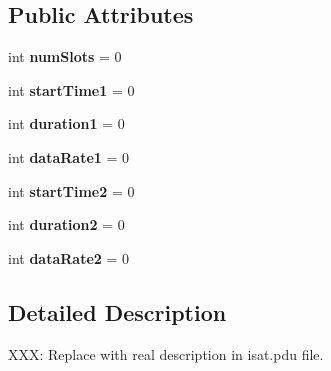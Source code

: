 \subsection*{Public Attributes}
\begin{DoxyCompactItemize}
\item 
int {\bfseries num\+Slots} = 0\hypertarget{classisat__trek_1_1_comm_schedule___command_a61d000b2dc1d4e82e8eb8c3fc8a2b0ad}{}\label{classisat__trek_1_1_comm_schedule___command_a61d000b2dc1d4e82e8eb8c3fc8a2b0ad}

\item 
int {\bfseries start\+Time1} = 0\hypertarget{classisat__trek_1_1_comm_schedule___command_a8d7e734093703c13828cab072f4adcd8}{}\label{classisat__trek_1_1_comm_schedule___command_a8d7e734093703c13828cab072f4adcd8}

\item 
int {\bfseries duration1} = 0\hypertarget{classisat__trek_1_1_comm_schedule___command_a0e425ffb9e0ac25963d0bf55d103ba5a}{}\label{classisat__trek_1_1_comm_schedule___command_a0e425ffb9e0ac25963d0bf55d103ba5a}

\item 
int {\bfseries data\+Rate1} = 0\hypertarget{classisat__trek_1_1_comm_schedule___command_af1d5b04d9d61ca853ae4fc6139dfeb06}{}\label{classisat__trek_1_1_comm_schedule___command_af1d5b04d9d61ca853ae4fc6139dfeb06}

\item 
int {\bfseries start\+Time2} = 0\hypertarget{classisat__trek_1_1_comm_schedule___command_a707181ec3f59bb6ae0f826f05753e747}{}\label{classisat__trek_1_1_comm_schedule___command_a707181ec3f59bb6ae0f826f05753e747}

\item 
int {\bfseries duration2} = 0\hypertarget{classisat__trek_1_1_comm_schedule___command_aaea85f88b7c92f0ec77814b574165e87}{}\label{classisat__trek_1_1_comm_schedule___command_aaea85f88b7c92f0ec77814b574165e87}

\item 
int {\bfseries data\+Rate2} = 0\hypertarget{classisat__trek_1_1_comm_schedule___command_a5b9d650cb616ae8922413f09bb4c8694}{}\label{classisat__trek_1_1_comm_schedule___command_a5b9d650cb616ae8922413f09bb4c8694}

\end{DoxyCompactItemize}


\subsection{Detailed Description}
X\+XX\+: Replace with real description in isat.\+pdu file. 

